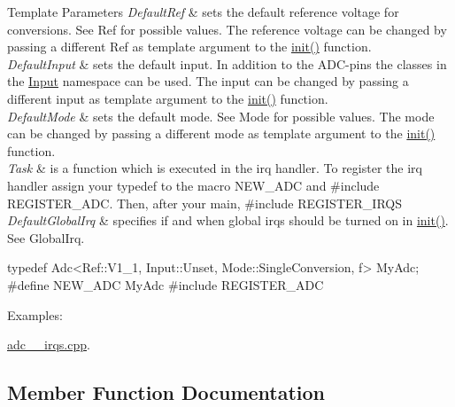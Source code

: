 \begin{DoxyTemplParams}{Template Parameters}
{\em Default\+Ref} & sets the default reference voltage for conversions. See Ref for possible values. The reference voltage can be changed by passing a different Ref as template argument to the \hyperlink{classadc_1_1Adc_a146fe898e16915e9b344019c59cdcfa3}{init()} function. \\
\hline
{\em Default\+Input} & sets the default input. In addition to the A\+D\+C-\/pins the classes in the \hyperlink{namespaceadc_1_1Input}{Input} namespace can be used. The input can be changed by passing a different input as template argument to the \hyperlink{classadc_1_1Adc_a146fe898e16915e9b344019c59cdcfa3}{init()} function. \\
\hline
{\em Default\+Mode} & sets the default mode. See Mode for possible values. The mode can be changed by passing a different mode as template argument to the \hyperlink{classadc_1_1Adc_a146fe898e16915e9b344019c59cdcfa3}{init()} function. \\
\hline
{\em Task} & is a function which is executed in the irq handler. To register the irq handler assign your typedef to the macro {\ttfamily N\+E\+W\+\_\+\+A\+DC} and {\ttfamily \#include R\+E\+G\+I\+S\+T\+E\+R\+\_\+\+A\+DC}. Then, after your main, {\ttfamily \#include R\+E\+G\+I\+S\+T\+E\+R\+\_\+\+I\+R\+QS} \\
\hline
{\em Default\+Global\+Irq} & specifies if and when global irqs should be turned on in {\ttfamily \hyperlink{classadc_1_1Adc_a146fe898e16915e9b344019c59cdcfa3}{init()}}. See Global\+Irq.\\
\hline
\end{DoxyTemplParams}
\begin{DoxyVerb}typedef Adc<Ref::V1_1, Input::Unset, Mode::SingleConversion, f> MyAdc;
#define NEW_ADC MyAdc
#include REGISTER_ADC\end{DoxyVerb}
 \begin{Desc}
\item[Examples\+: ]\par
\hyperlink{adc_2_irqs_8cpp-example}{adc\+\_\+\_\+irqs.\+cpp}.\end{Desc}


\subsection{Member Function Documentation}
